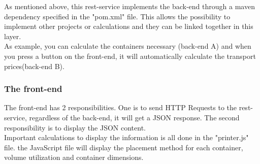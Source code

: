\documentclass[a4paper,12pt]{article}
\begin{document}
As mentioned above, this rest-service implements the back-end through a maven dependency specified in the "pom.xml" file. This allows the possibility to implement other projects or calculations and they can be linked together in this layer. \\

As example, you can calculate the containers necessary (back-end A) and when you press a button on the front-end, it will automatically calculate the transport prices(back-end B).

\subsubsection{The front-end}
The front-end has 2 responsibilities. One is to send HTTP Requests to the rest-service, regardless of the back-end, it will get a JSON response. The second responsibility is to display the JSON content. \\

Important calculations to display the information is all done in the "printer.js" file. the JavaScript file will display the placement method for each container, volume utilization and container dimensions. 
\end{document}
